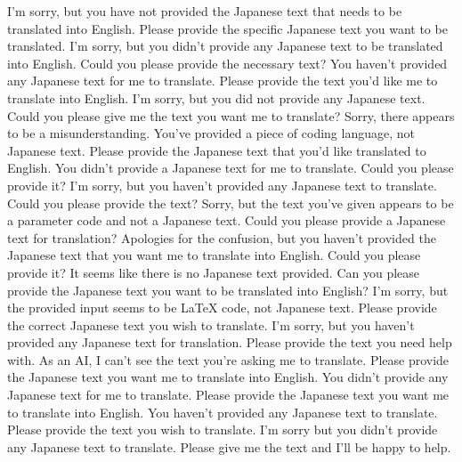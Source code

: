 {%
I'm sorry, but you have not provided the Japanese text that needs to be translated into English. Please provide the specific Japanese text you want to be translated.
I'm sorry, but you didn't provide any Japanese text to be translated into English. Could you please provide the necessary text?
You haven't provided any Japanese text for me to translate. Please provide the text you'd like me to translate into English.
I'm sorry, but you did not provide any Japanese text. Could you please give me the text you want me to translate?
Sorry, there appears to be a misunderstanding. You've provided a piece of coding language, not Japanese text. Please provide the Japanese text that you'd like translated to English.
You didn't provide a Japanese text for me to translate. Could you please provide it?
I'm sorry, but you haven't provided any Japanese text to translate. Could you please provide the text?
Sorry, but the text you've given appears to be a parameter code and not a Japanese text. Could you please provide a Japanese text for translation?
Apologies for the confusion, but you haven't provided the Japanese text that you want me to translate into English. Could you please provide it?
It seems like there is no Japanese text provided. Can you please provide the Japanese text you want to be translated into English?
I'm sorry, but the provided input seems to be LaTeX code, not Japanese text. Please provide the correct Japanese text you wish to translate.
I'm sorry, but you haven't provided any Japanese text for translation. Please provide the text you need help with.
As an AI, I can't see the text you're asking me to translate. Please provide the Japanese text you want me to translate into English.
You didn't provide any Japanese text for me to translate. Please provide the Japanese text you want me to translate into English.
You haven't provided any Japanese text to translate. Please provide the text you wish to translate.
I'm sorry but you didn't provide any Japanese text to translate. Please give me the text and I'll be happy to help.
}
